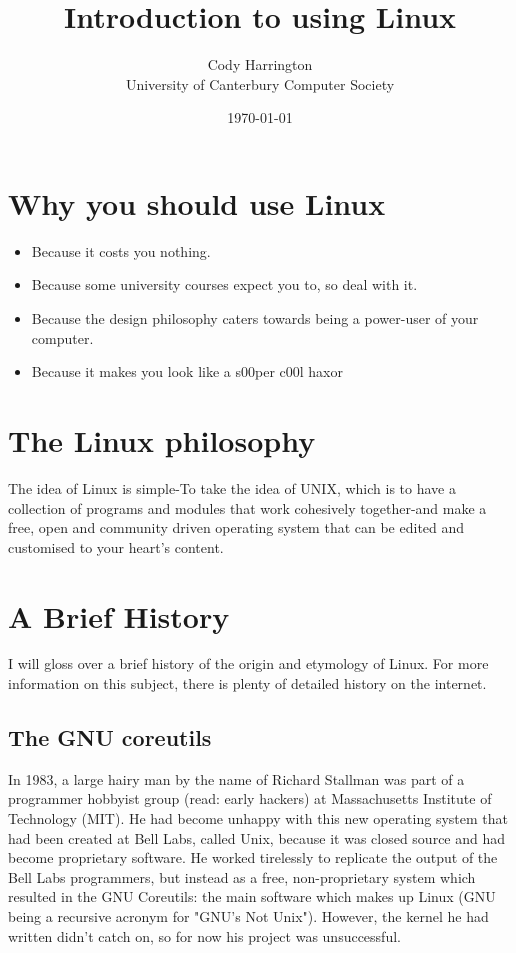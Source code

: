 \documentclass{article}
\begin{document}
\title{Introduction to using Linux}
\author{Cody Harrington\\University of Canterbury Computer Society}
\date{\today}
\maketitle

\section{Why you should use Linux}
\begin{itemize}
\item Because it costs you nothing.
\item Because some university courses expect you to, so deal with it.
\item Because the design philosophy caters towards being a power-user of your computer.
\item Because it makes you look like a s00per c00l haxor
\end{itemize}

\section{The Linux philosophy}
The idea of Linux is simple-To take the idea of UNIX, which is to have a collection of programs and modules that work cohesively together-and make a free, open and community driven operating system that can be edited and customised to your heart's content.

\section{A Brief History}

I will gloss over a brief history of the origin and etymology of Linux. For more information on this subject, there is plenty of detailed history on the internet.

\subsection{The GNU coreutils}
In 1983, a large hairy man by the name of Richard Stallman was part of a programmer hobbyist group (read: early hackers) at Massachusetts Institute of Technology (MIT). He had become unhappy with this new operating system that had been created at Bell Labs, called Unix, because it was closed source and had become proprietary software. He worked tirelessly to replicate the output of the Bell Labs programmers, but instead as a free, non-proprietary system which resulted in the GNU Coreutils: the main software which makes up Linux (GNU being a recursive acronym for "GNU's Not Unix"). However, the kernel he had written didn't catch on, so for now his project was unsuccessful.
\end{document}
